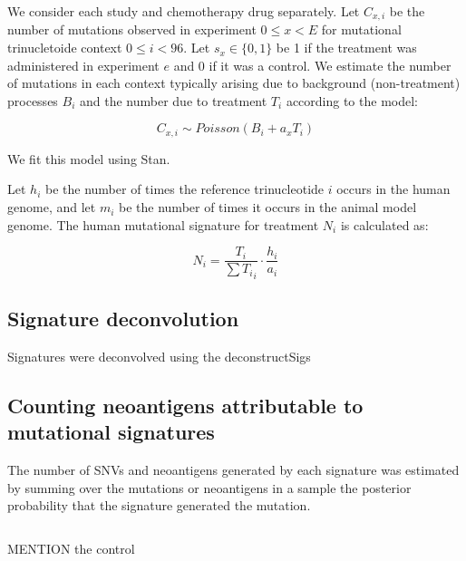 We consider each study and chemotherapy drug separately. Let $C_{x,i}$ be the number of mutations observed in experiment $0 \leq x \lt E$ for mutational trinucletoide context $0 \leq i \lt 96$. Let $s_x \in \{0,1\}$ be 1 if the treatment was administered in experiment $e$ and 0 if it was a control. We estimate the number of mutations in each context typically arising due to background (non-treatment) processes $B_i$ and the number due to treatment $T_i$ according to the model:

\[
C_{x,i} \sim \mathit{Poisson}(B_i + a_x T_i)
\]

We fit this model using Stan\cite{Gelman_2015}.

Let $h_i$ be the number of times the reference trinucleotide $i$ occurs in the human genome, and let $m_i$ be the number of times it occurs in the animal model genome. The human mutational signature for treatment $N_i$ is calculated as:

\[
N_i = \frac{T_i}{\sum{T_i}_i} \cdot \frac{h_i}{a_i}
\]


\subsection*{Signature deconvolution}
Signatures were deconvolved using the deconstructSigs\cite{Rosenthal_2016}

\subsection*{Counting neoantigens attributable to mutational signatures}
The number of SNVs and neoantigens generated by each signature was estimated by summing over the mutations or neoantigens in a sample the posterior probability that the signature generated the mutation.

\[



\]


MENTION the control



